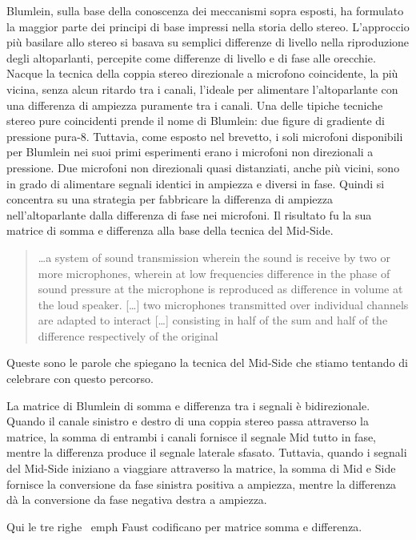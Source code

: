 Blumlein, sulla base della conoscenza dei meccanismi sopra esposti, ha formulato
la maggior parte dei principi di base impressi nella storia dello stereo.
L'approccio più basilare allo stereo si basava su semplici differenze di livello
nella riproduzione degli altoparlanti, percepite come differenze di livello e di
fase alle orecchie. Nacque la tecnica della coppia stereo direzionale a
microfono coincidente, la più vicina, senza alcun ritardo tra i canali,
l'ideale per alimentare l'altoparlante con una differenza di ampiezza puramente
tra i canali. Una delle tipiche tecniche stereo pure coincidenti prende il nome
di Blumlein: due figure di gradiente di pressione pura-8. Tuttavia, come esposto
nel brevetto, i soli microfoni disponibili per Blumlein nei suoi primi
esperimenti erano i microfoni non direzionali a pressione. Due microfoni non
direzionali quasi distanziati, anche più vicini, sono in grado di alimentare
segnali identici in ampiezza e diversi in fase. Quindi si concentra su una
strategia per fabbricare la differenza di ampiezza nell'altoparlante dalla
differenza di fase nei microfoni. Il risultato fu la sua matrice di somma e
differenza alla base della tecnica del Mid-Side.

\begin{quotation}
\ldots a system of sound transmission wherein the sound
is receive by two or more microphones, wherein at low frequencies difference in
the phase of sound pressure at the microphone is reproduced as difference in
volume at the loud speaker. [\ldots] two microphones transmitted over individual
channels are adapted to interact [\ldots] consisting in half of the sum and half
of the difference respectively of the original \cite{ab58}
\end{quotation}

Queste sono le parole che spiegano la tecnica del Mid-Side che stiamo tentando
di celebrare con questo percorso.

La matrice di Blumlein di somma e differenza tra i segnali è bidirezionale.
Quando il canale sinistro e destro di una coppia stereo passa attraverso la
matrice, la somma di entrambi i canali fornisce il segnale Mid tutto in fase,
mentre la differenza produce il segnale laterale sfasato. Tuttavia, quando i
segnali del Mid-Side iniziano a viaggiare attraverso la matrice, la somma di Mid
e Side fornisce la conversione da fase sinistra positiva a ampiezza, mentre la
differenza dà la conversione da fase negativa destra a ampiezza.

Qui le tre righe \ emph {Faust} codificano per matrice somma e differenza.%

